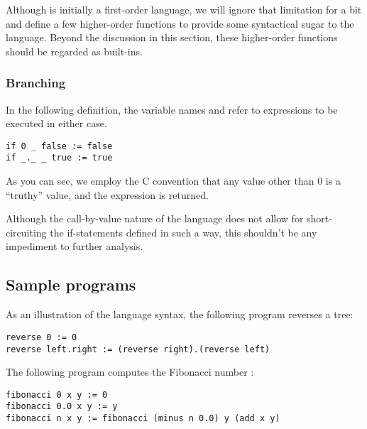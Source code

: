 Although  is initially a first-order language, we will ignore that
limitation for a bit and define a few higher-order functions to provide some
syntactical sugar to the language. Beyond the discussion in this section, these
higher-order functions should be regarded as  built-ins.

\subsubsection{Branching}

In the following definition, the variable names  and 
refer to expressions to be executed in either case.

\begin{verbatim}
if 0 _ false := false
if _._ _ true := true
\end{verbatim}

As you can see, we employ the C convention that any value other than $0$ is a
``truthy'' value, and the expression  is returned.

Although the call-by-value nature of the language does not allow for
short-circuiting the if-statements defined in such a way, this shouldn't be any
impediment to further analysis.

\subsection{Sample programs}

As an illustration of the language syntax, the following program reverses a tree:

\begin{verbatim}
reverse 0 := 0
reverse left.right := (reverse right).(reverse left)
\end{verbatim}

The following program computes the Fibonacci number :

\begin{verbatim}
fibonacci 0 x y := 0
fibonacci 0.0 x y := y
fibonacci n x y := fibonacci (minus n 0.0) y (add x y)
\end{verbatim}
